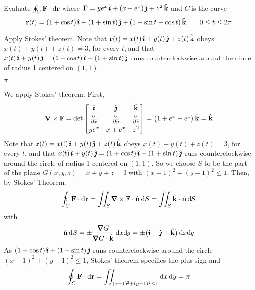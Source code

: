 \begin{question}
Evaluate
 $\oint_C \mathbf{F}\cdot \mathrm{d}\mathbf{r}$ where $\mathbf{F}=ye^x\,\hat{\pmb{\imath}}+(x+e^x)\,\hat{\pmb{\jmath}}+z^2\,\hat{\mathbf{k}}$ and
$C$ is the curve 
\begin{equation*}
\mathbf{r}(t)=(1+\cos t)\,\hat{\pmb{\imath}}+(1+\sin t)\,\hat{\pmb{\jmath}}+(1-\sin t-\cos t)\,\hat{\mathbf{k}}\qquad
0\le t\le 2\pi
\end{equation*}
\end{question}

\begin{hint} 
Apply Stokes' theorem.
Note that $\mathbf{r}(t) = x(t)\,\hat{\pmb{\imath}}+y(t)\,\hat{\pmb{\jmath}} +z(t)\,\hat{\mathbf{k}}$
obeys $x(t)+y(t)+z(t)=3$, for every $t$, and that $x(t)\,\hat{\pmb{\imath}}+y(t)\,\hat{\pmb{\jmath}}
=(1+\cos t)\,\hat{\pmb{\imath}}+(1+\sin t)\,\hat{\pmb{\jmath}}$ runs counterclockwise around
the circle of radius 1 centered on $(1,1)$.
\end{hint}

\begin{answer} 
$\pi$
\end{answer}

\begin{solution} 
We apply Stokes' theorem. First,  
\begin{equation*}
\vnabla\times\vF=\det\left[\begin{matrix}\hi & \hj & \hk \\[0.05in]
                  \pdiff{}{x} &  \pdiff{}{y} & \pdiff{}{z} \\[0.05in]
                  ye^x & x+e^x & z^2 
                 \end{matrix}\right] 
=\big(1+e^x-e^x\big)\,\hk
=\hk
\end{equation*}
Note that $\mathbf{r}(t) = x(t)\,\hat{\pmb{\imath}}+y(t)\,\hat{\pmb{\jmath}} +z(t)\,\hat{\mathbf{k}}$
obeys $x(t)+y(t)+z(t)=3$, for every $t$, and that $x(t)\,\hat{\pmb{\imath}}+y(t)\,\hat{\pmb{\jmath}}
=(1+\cos t)\,\hat{\pmb{\imath}}+(1+\sin t)\,\hat{\pmb{\jmath}}$ runs counterclockwise around
the circle of radius 1 centered on $(1,1)$. So we choose $S$
to be the part of the plane $G(x,y,z)=x+y+z=3$ with $(x-1)^2+(y-1)^2\le 1$.
Then, by Stokes' Theorem,
\begin{equation*}
\oint_C \vF\cdot \dee{\vr}
=\dblInt_S \vnabla\times\vF\cdot \hn\,\dee{S}
=\dblInt_S \hk\cdot \hn\,\dee{S}
\end{equation*}
with
\begin{equation*}
\hn\,\dee{S} = \pm \frac{\vnabla G}{\vnabla G\cdot\hk}\,\dee{x} \dee{y}
= \pm\big(\hi+\hj+\hk\big)\,\dee{x} \dee{y}
\end{equation*}
As $(1+\cos t)\,\hat{\pmb{\imath}}+(1+\sin t)\,\hat{\pmb{\jmath}}$ runs counterclockwise around
the circle $(x-1)^2+(y-1)^2\le 1$, Stokes' theorem
specifies the plus sign and
\begin{equation*}
\oint_C \mathbf{F}\cdot \mathrm{d}\mathbf{r}
=\iint_{(x-1)^2+(y-1)^2\le 1} \mathrm{d}x\,\mathrm{d}y
=\pi
\end{equation*}

\end{solution}



